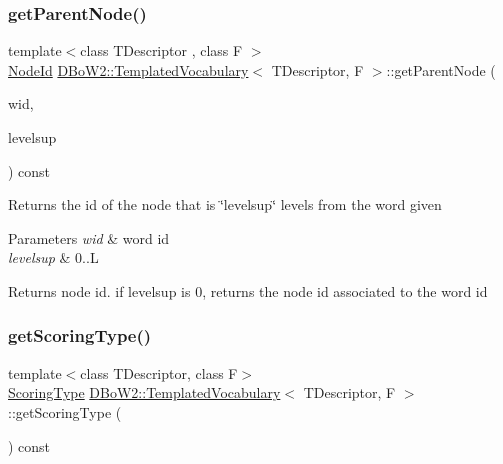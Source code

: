 \subsubsection{\texorpdfstring{get\+Parent\+Node()}{getParentNode()}}
{\footnotesize\ttfamily template$<$class T\+Descriptor , class F $>$ \\
\mbox{\hyperlink{namespace_d_bo_w2_a3a0fa9c50c0df508759362d6204566f2}{Node\+Id}} \mbox{\hyperlink{class_d_bo_w2_1_1_templated_vocabulary}{D\+Bo\+W2\+::\+Templated\+Vocabulary}}$<$ T\+Descriptor, F $>$\+::get\+Parent\+Node (\begin{DoxyParamCaption}\item[{\mbox{\hyperlink{namespace_d_bo_w2_ab1a0d3283b2d4690a383372ed20bfeb5}{Word\+Id}}}]{wid,  }\item[{int}]{levelsup }\end{DoxyParamCaption}) const\hspace{0.3cm}{\ttfamily [virtual]}}

Returns the id of the node that is \char`\"{}levelsup\char`\"{} levels from the word given 
\begin{DoxyParams}{Parameters}
{\em wid} & word id \\
\hline
{\em levelsup} & 0..L \\
\hline
\end{DoxyParams}
\begin{DoxyReturn}{Returns}
node id. if levelsup is 0, returns the node id associated to the word id 
\end{DoxyReturn}
\mbox{\label{class_d_bo_w2_1_1_templated_vocabulary_ad830e1e3e547e5d9d45971662afca3d5}} 
\subsubsection{\texorpdfstring{get\+Scoring\+Type()}{getScoringType()}}
{\footnotesize\ttfamily template$<$class T\+Descriptor, class F$>$ \\
\mbox{\hyperlink{namespace_d_bo_w2_aa252a592dd607c6e60dede06ceef2722}{Scoring\+Type}} \mbox{\hyperlink{class_d_bo_w2_1_1_templated_vocabulary}{D\+Bo\+W2\+::\+Templated\+Vocabulary}}$<$ T\+Descriptor, F $>$\+::get\+Scoring\+Type (\begin{DoxyParamCaption}{ }\end{DoxyParamCaption}) const\hspace{0.3cm}{\ttfamily [inline]}}

